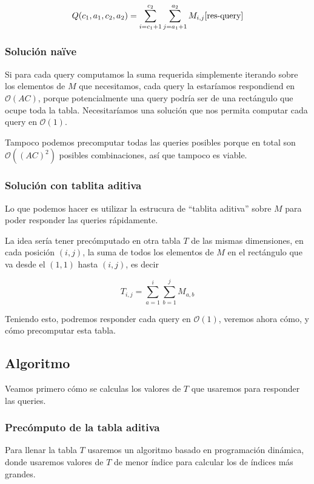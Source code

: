 \begin{equation}
Q(c_1, a_1, c_2, a_2) = \sum\limits_{i = c_1+1}^{c_2} \sum\limits_{j = a_1+1}^{a_2} M_{i,j}
\ref{res-query}
\end{equation}

\subsubsection*{Solución naïve}
Si para cada query computamos la suma requerida simplemente iterando sobre los elementos 
de $M$ que necesitamos, cada query la estaríamos respondiend en $\mathcal{O}(AC)$, porque potencialmente 
una query podría ser de una rectángulo que ocupe toda la tabla. Necesitaríamos una solución 
que nos permita computar cada query en $\mathcal{O}(1)$. 

Tampoco podemos precomputar todas las queries posibles porque en total son $\mathcal{O}((AC)^2)$ 
posibles combinaciones, así que tampoco es viable.  

\subsubsection*{Solución con tablita aditiva}
Lo que podemos hacer es utilizar la estrucura de ``tablita aditiva'' sobre $M$ 
para poder responder las queries rápidamente. 

La idea sería tener precómputado en otra tabla $T$ de las mismas dimensiones, en cada 
posición $(i,j)$, la suma de todos los elementos de $M$ en el rectángulo que va desde el $(1,1)$ 
hasta $(i,j)$, es decir 

\begin{equation}
T_{i,j} = \sum\limits_{a = 1}^{i} \sum\limits_{b = 1}^{j} M_{a,b}
\end{equation}

Teniendo esto, podremos responder cada query en $\mathcal{O}(1)$, veremos ahora 
cómo, y cómo precomputar esta tabla. 


\subsection{Algoritmo}

Veamos primero cómo se calculas los valores de $T$ que usaremos para responder las queries. 

\subsubsection*{Precómputo de la tabla aditiva}
Para llenar la tabla $T$ usaremos un algoritmo basado en programación dinámica, 
donde usaremos valores de $T$ de menor índice para calcular los de índices más grandes. 

